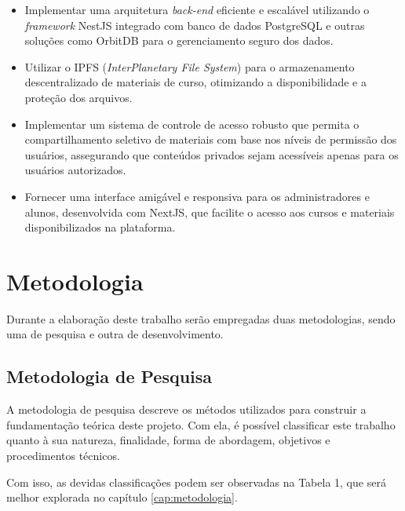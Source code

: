 \begin{itemize}
    \item Implementar uma arquitetura \textit{back-end} eficiente e escalável utilizando o \textit{framework} NestJS integrado com banco de dados PostgreSQL e outras soluções como OrbitDB para o gerenciamento seguro dos dados.
    \item Utilizar o IPFS (\textit{InterPlanetary File System}) para o armazenamento descentralizado de materiais de curso, otimizando a disponibilidade e a proteção dos arquivos.
    \item Implementar um sistema de controle de acesso robusto que permita o compartilhamento seletivo de materiais com base nos níveis de permissão dos usuários, assegurando que conteúdos privados sejam acessíveis apenas para os usuários autorizados.
    \item Fornecer uma interface amigável e responsiva para os administradores e alunos, desenvolvida com NextJS, que facilite o acesso aos cursos e materiais disponibilizados na plataforma.
\end{itemize}

\section{Metodologia}

Durante a elaboração deste trabalho serão empregadas duas metodologias, sendo uma de pesquisa e outra de desenvolvimento.

\subsection{Metodologia de Pesquisa}

A metodologia de pesquisa descreve os métodos utilizados para construir a fundamentação teórica deste projeto. Com ela, é possível classificar este trabalho quanto à sua natureza, finalidade, forma de abordagem, objetivos e procedimentos técnicos.

Com isso, as devidas classificações podem ser observadas na Tabela 1, que será melhor explorada no capítulo \ref{cap:metodologia}.

\setlength{\extrarowheight}{5pt}

